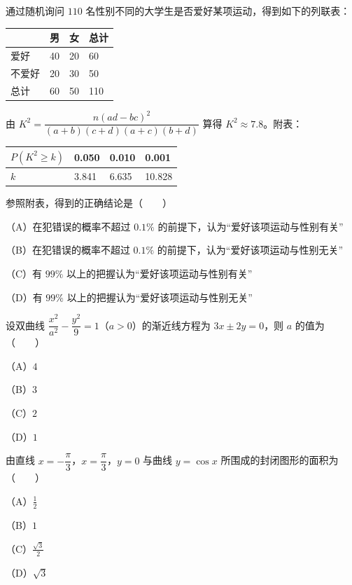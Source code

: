 \begin{question}
通过随机询问 $110$ 名性别不同的大学生是否爱好某项运动，得到如下的列联表：

\begin{center}
\begin{tabular}{llll}
\toprule
 & 男 & 女 & 总计 \\
\midrule
爱好 & 40 & 20 & 60 \\
不爱好 & 20 & 30 & 50 \\
总计 & 60 & 50 & 110 \\
\bottomrule
\end{tabular}
\end{center}

由 $K^2=\dfrac{n(ad-bc)^2}{(a+b)(c+d)(a+c)(b+d)}$ 算得 $K^2\approx7.8$。附表：

\begin{center}
\begin{tabular}{llll}
\toprule
$P(K^2\geqslant k)$ & 0.050 & 0.010 & 0.001 \\
\midrule
$k$ & 3.841 & 6.635 & 10.828 \\
\bottomrule
\end{tabular}
\end{center}

参照附表，得到的正确结论是\mbox{（　　）}

（A）在犯错误的概率不超过 $0.1\%$ 的前提下，认为“爱好该项运动与性别有关”

（B）在犯错误的概率不超过 $0.1\%$ 的前提下，认为“爱好该项运动与性别无关”

（C）有 $99\%$ 以上的把握认为“爱好该项运动与性别有关”

（D）有 $99\%$ 以上的把握认为“爱好该项运动与性别无关”

\end{question}
\begin{question}
设双曲线 $\dfrac{x^2}{a^2}-\dfrac{y^2}9=1$（$a>0$）的渐近线方程为 $3x\pm2y=0$，则 $a$ 的值为\mbox{（　　）}

（A）$4$

（B）$3$

（C）$2$

（D）$1$

\end{question}
\begin{question}
由直线 $x=-\dfrac\pi3$，$x=\dfrac\pi3$，$y=0$ 与曲线 $y=\cos x$ 所围成的封闭图形的面积为\mbox{（　　）}

（A）$\frac12$

（B）$1$

（C）$\frac{\sqrt3}2$

（D）$\sqrt3$

\end{question}
